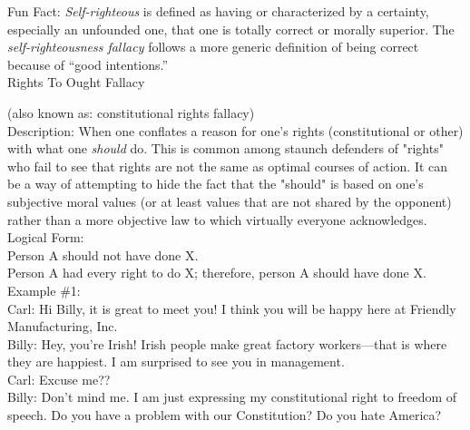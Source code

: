 \documentclass[a4paper,12pt,single,pdftex]{scrartcl}
\begin{document}
    
      Fun Fact: {\em Self-righteous} is defined as having or characterized by a certainty, especially an unfounded one, that one is totally correct or morally superior. The {\em self-righteousness fallacy} follows a more generic definition of being correct because of “good intentions.”
    \\

  

Rights To Ought Fallacy
    
      (also known as: constitutional rights fallacy)
    \\

  
    
      Description: When one conflates a reason for one's rights (constitutional or other) with what one {\it should} do.  This is common among staunch defenders of "rights" who fail to see that rights are not the same as optimal courses of action.  It can be a way of attempting to hide the fact that the "should" is based on one's subjective moral values (or at least values that are not shared by the opponent) rather than a more objective law to which virtually everyone acknowledges.
    \\

    
      Logical Form:
    \\

    
      Person A should not have done X.
    \\

    
      Person A had every right to do X; therefore, person A should have done X.
    \\

    
      Example \#1:
    \\

    
      Carl: Hi Billy, it is great to meet you! I think you will be happy here at Friendly Manufacturing, Inc.
    \\

    
      Billy: Hey, you're Irish!  Irish people make great factory workers—that is where they are happiest.  I am surprised to see you in management. 
    \\

    
      Carl: Excuse me??
    \\

    
      Billy: Don't mind me.  I am just expressing my constitutional right to freedom of speech.  Do you have a problem with our Constitution?  Do you hate America?
    \\
\end{document}
